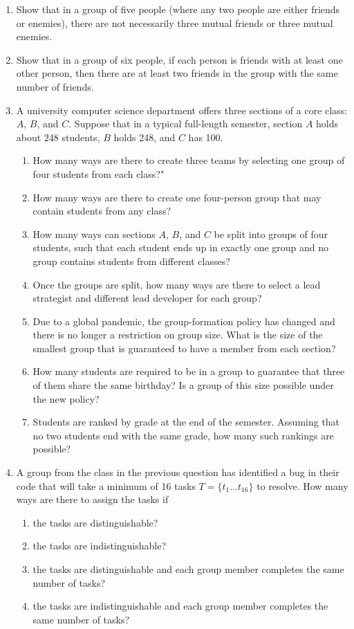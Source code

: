 \begin{enumerate}
\item Show that in a group of five people (where any two people are either friends or enemies), there are not necessarily three mutual friends or three mutual enemies. 

\item Show that in a group of six people, if each person is friends with at least one other person, then there are at least two friends in the group with the same number of friends. 


\item A university computer science department offers three sections of a core class: $A$, $B$, and $C$. Suppose that in a typical full-length semester, section $A$ holds about 248 students, $B$ holds 248, and $C$ has 100. 
\begin{enumerate}
    \item How many ways are there to create three teams by selecting one group of four students from each class?"
    \item How many ways are there to create one four-person group that may contain students from any class?
    \item How many ways can sections $A$, $B$, and $C$ be split into groups of four students, such that each student ends up in exactly one group and no group contains students from different classes?
    \item Once the groups are split, how many ways are there to select a lead strategist and different lead developer for each group?
    \item Due to a global pandemic, the group-formation policy has changed and there is no longer a restriction on group size. What is the size of the smallest group that is guaranteed to have a member from each section?
    \item How many students are required to be in a group to guarantee that three of them share the same birthday? Is a group of this size possible under the new policy?
    \item Students are ranked by grade at the end of the semester. Assuming that no two students end with the same grade, how many such rankings are possible?
\end{enumerate}

\item A group from the class in the previous question has identified a bug in their code that will take a minimum of 16 tasks $T = \{t_1...t_{16}\}$ to resolve. How many ways are there to assign the tasks if 
\begin{enumerate}
    \item the tasks are distinguishable?
    \item the tasks are indistinguishable?
    \item the tasks are distinguishable and each group member completes the same number of tasks?
    \item the tasks are indistinguishable and each group member completes the same number of tasks?
\end{enumerate}


\end{enumerate}
